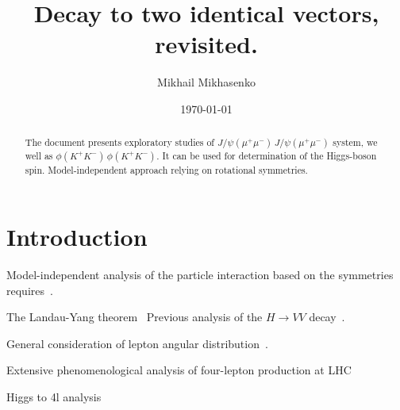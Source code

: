 \documentclass[prd,preprintnumbers,floatfix,
nofootinbib,superscriptaddress]{revtex4}
\begin{document}
\title{Decay to two identical vectors, revisited.}

\author{Mikhail Mikhasenko}

\date{\today}

\begin{abstract}
The document presents exploratory studies of $J/\psi (\mu^+\mu^-)\,J/\psi (\mu^+\mu^-)$ system,
we well as $\phi (K^+K^-)\,\phi (K^+K^-)$.
It can be used for determination of the Higgs-boson spin.
Model-independent approach relying on rotational symmetries.
\end{abstract}

\nopagebreak
\maketitle

%
\section{Introduction}

Model-independent analysis of the particle interaction based on the
symmetries requires~\cite{Jacob:1959at}.

The Landau-Yang theorem~\cite{Yang:1950rg,Landau:1948kw}
Previous analysis of the $H\to VV$ decay~\cite{Treiman:1978ge}.

General consideration of lepton angular distribution~\cite{Collins:1977iv}.

Extensive phenomenological analysis of four-lepton production at LHC~\cite{Bolognesi:2012mm,Gao:2010qx}

Higgs to 4l analysis~\cite{Aad:2013xqa,CMS:2018mmw}
\end{document}
